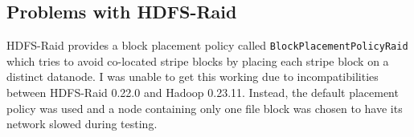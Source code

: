 \documentclass{ucetd}
\newcommand{\code}[1]{\texttt{#1}}
\begin{document}
\begin{appendices}
    \section{Problems with HDFS-Raid}

    HDFS-Raid \cite{HDFS-Raid} provides a block placement policy called
    \code{BlockPlacementPolicyRaid} which tries to avoid co-located stripe
    blocks by placing each stripe block on a distinct datanode. I was unable to
    get this working due to incompatibilities between HDFS-Raid 0.22.0 and
    Hadoop 0.23.11. Instead, the default placement policy was used and a node
    containing only one file block was chosen to have its network slowed during
    testing.

\end{appendices}



{}

%
%
\end{document}
